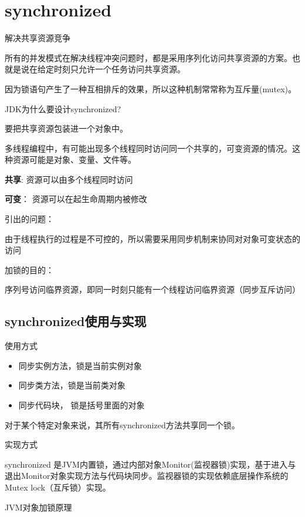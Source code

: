 \section{synchronized}
\label{chap:synchronized}

解决共享资源竞争

所有的并发模式在解决线程冲突问题时，都是采用序列化访问共享资源的方案。也就是说在给定时刻只允许一个任务访问共享资源。

因为锁语句产生了一种互相排斥的效果，所以这种机制常常称为互斥量(mutex)。

JDK为什么要设计synchronized?

要把共享资源包装进一个对象中。

多线程编程中，有可能出现多个线程同时访问同一个共享的，可变资源的情况。这种资源可能是对象、变量、文件等。

\textbf{共享}:  资源可以由多个线程同时访问

\textbf{可变}： 资源可以在起生命周期内被修改

引出的问题：

由于线程执行的过程是不可控的，所以需要采用同步机制来协同对对象可变状态的访问


加锁的目的：

序列号访问临界资源，即同一时刻只能有一个线程访问临界资源（同步互斥访问）



\subsection{synchronized使用与实现}

使用方式

\begin{itemize}
    \item 同步实例方法，锁是当前实例对象
    \item 同步类方法，锁是当前类对象
    \item 同步代码块， 锁是括号里面的对象
\end{itemize}

对于某个特定对象来说，其所有synchronized方法共享同一个锁。

实现方式

synchronized 是JVM内置锁，通过内部对象Monitor(监视器锁)实现，基于进入与退出Monitor对象实现方法与代码块同步。监视器锁的实现依赖底层操作系统的Mutex lock（互斥锁）实现。

JVM对象加锁原理

